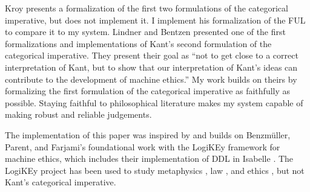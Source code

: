 \begin{isabellebody}
\begin{isamarkuptext}
Kroy \citep{kroy} presents a formalization of the first two formulations of the categorical imperative, 
but does not implement it. I implement his formalization of the FUL to compare it to my system. 
Lindner and Bentzen \citep{BL} presented one of the first formalizations and implementations of 
Kant's second formulation of the categorical imperative. They present their goal as ``not to get 
close to a correct interpretation of Kant, but to show that our interpretation of Kant’s ideas can 
contribute to the development of machine ethics.'' My work builds on theirs by formalizing the 
first formulation of the categorical imperative as faithfully as possible. Staying faithful to 
philosophical literature makes my system capable of making robust and reliable judgements. 

The implementation of this paper was inspired by and builds on Benzmüller, Parent, and Farjami's 
foundational work with the LogiKEy framework for machine ethics, which includes their implementation 
of DDL in Isabelle \citep{BFP, logikey}. The LogiKEy project has been used to study metaphysics 
\citep{godel, metaphysics1}, law \citep{constitution}, and ethics \citep{gewirth}, but not 
Kant's categorical imperative.%
\end{isamarkuptext}\isamarkuptrue%
%
\isadelimdocument
%
\endisadelimdocument
%
\isatagdocument
%
\isamarkuptrue%
%
\endisatagdocument
{\isafolddocument}%
%
\isadelimdocument
%
\endisadelimdocument
%
\isadelimtheory
%
\endisadelimtheory
%
\isatagtheory
%
\endisatagtheory
{\isafoldtheory}%
%
\isadelimtheory
%
\endisadelimtheory
%
\end{isabellebody}%
\endinput
